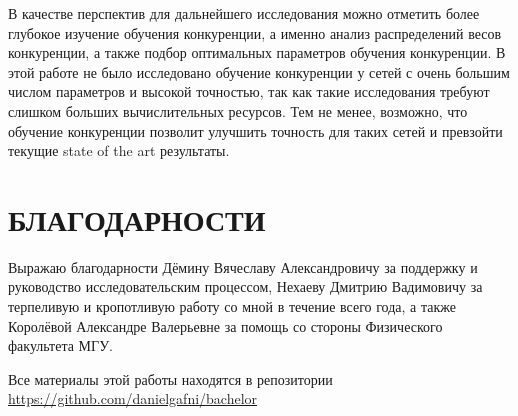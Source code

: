 \documentclass[a4paper]{article}
\begin{document}
В качестве перспектив для дальнейшего исследования можно отметить более глубокое изучение обучения конкуренции, а именно анализ распределений весов конкуренции, а также подбор оптимальных параметров обучения конкуренции. В этой работе не было исследовано обучение конкуренции у сетей с очень большим числом параметров и высокой точностью, так как такие исследования требуют слишком больших вычислительных ресурсов. Тем не менее, возможно, что обучение конкуренции позволит улучшить точность для таких сетей и превзойти текущие state of the art результаты.

\clearpage
 
\section*{БЛАГОДАРНОСТИ}
Выражаю благодарности Дёмину Вячеславу Александровичу за поддержку и руководство исследовательским процессом, Нехаеву Дмитрию Вадимовичу за терпеливую и кропотливую работу со мной в течение всего года, а также Королёвой Александре Валерьевне за помощь со стороны Физического факультета МГУ.

\clearpage 

\printbibliography[heading=bibintoc,type=article,title={СПИСОК ИСПОЛЬЗОВАННОЙ ЛИТЕРАТУРЫ}]

\begin{center}
Все материалы этой работы находятся в репозитории\\
\href{https://github.com/danielgafni/bachelor}{https://github.com/danielgafni/bachelor} 
\end{center}
\end{document}
